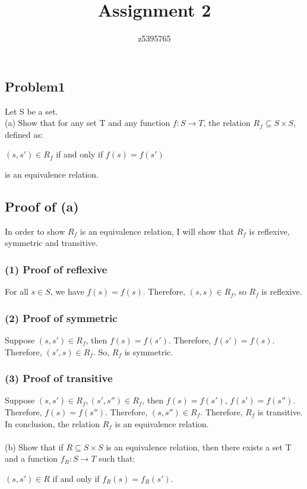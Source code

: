 \documentclass[]{article}
\title{Assignment 2}
\author{z5395765}
\begin{document}
	\maketitle

	\begin{spacing}{1.5}

		\section*{Problem1}
		Let S be a set.\\
		(a) Show that for any set T and any function $ f : S \rightarrow T$, the relation $ R_f \subseteq S \times S$, defined as:\\
		\begin{center}
				$ (s, s') \in R_f$ if and only if $f(s) = f(s')$
		\end{center} 
		is an equivalence relation.
		
		\subsection*{Proof of (a)}
		In order to show $ R_f $ is an equivalence relation, I will show that $ R_f $ is reflexive, symmetric and transitive.
		\subsubsection*{(1) Proof of reflexive}
		For all $ s \in S $, we have $ f(s) = f(s) $. Therefore, $ (s, s) \in R_f$, so $ R_f $ is reflexive.
		 \subsubsection*{(2) Proof of symmetric} 
		 Suppose $ (s, s') \in R_f $, then $ f(s) = f(s') $. Therefore, $ f(s') = f(s) $. Therefore, $ (s', s) \in R_f $. So, $ R_f $ is symmetric.
		  \subsubsection*{(3) Proof of transitive}
		  Suppose $ (s, s') \in R_f, (s', s'') \in R_f $, then $ f(s) = f(s')$, $ f(s') = f(s'') $. Therefore, $ f(s) = f(s'') $. Therefore, $ (s, s'') \in R_f $. Therefore, $ R_f $ is transitive.\\
		  In conclusion, the relation $ R_f $ is an equivalence relation.\\
		  ~\\
		(b) Show that if $ R \subseteq S \times S $ is an equivalence relation, then there exists a set T and a function $ f_R : S \rightarrow T $ such that:
		\begin{center}
			$ (s, s') \in R $ if and only if $ f_R(s) = f_R(s') $.
		\end{center}

\end{spacing}
\end{document}
